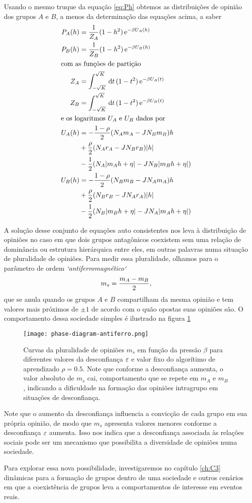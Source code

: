 Usando o mesmo truque da equação \eqref{eq:Ph} obtemos as distribuições de opinião dos grupos $A$ e $B$, a menos da determinação das equações acima, a saber
\begin{align}
  P_A(h) & = {1\over Z_A}(1-h^2)\,\mathrm{e}^{-\beta U_A(h)} \\
  P_B(h) & = {1\over Z_B}(1-h^2)\,\mathrm{e}^{-\beta U_B(h)} \\
\intertext{com as funções de partição}
  Z_A & = \int_{-\sqrt{K}}^{\sqrt{K}}\,\mathrm{d} t\,(1-t^2)\,\mathrm{e}^{-\beta U_A(t)} \\
  Z_B & = \int_{-\sqrt{K}}^{\sqrt{K}}\,\mathrm{d} t\,(1-t^2)\,\mathrm{e}^{-\beta U_B(t)} \\
\intertext{e os logaritmos $U_A$ e $U_B$ dados por}
  U_A(h) & = -{1-\rho\over2}(N_Am_A - JN_Bm_B)h \notag\\
  & + {\rho\over2}(N_Ar_A-JN_Br_B)|h| \notag \\
  & - {1 \over 2}(N_A|m_Ah+\eta|-JN_B|m_Bh+\eta|) \\
  U_B(h) & = -{1-\rho\over2}(N_Bm_B - JN_Am_A)h \notag\\
  & + {\rho\over2}(N_Br_B-JN_Ar_A)|h| \notag \\
  & - {1 \over 2}(N_B|m_Bh+\eta|-JN_A|m_Ah+\eta|)
\end{align}

A solução desse conjunto de equações auto consistentes nos leva à distribuição de opiniões no caso em que dois grupos antagônicos coexistem sem uma relação de dominância ou estrutura hierárquica entre eles, em outras palavras numa situação de pluralidade de opiniões.
Para medir essa pluralidade, olhamos para o parâmetro de ordem \emph{`antiferromagnético`} $$m_s = {m_A - m_B \over 2}\text{,}$$ que se anula quando os grupos $A$ e $B$ compartilham da mesma opinião e tem valores mais próximos de $\pm 1$ de acordo com o quão opostas suas opiniões são.
O comportamento dessa sociedade simples é ilustrado na figura \ref{fig:pd-antiferro}

\begin{figure}[h!]\label{fig:pd-antiferro}
  \centering
  \texttt{[image: phase-diagram-antiferro.png]}
  \caption{Curvas da pluralidade de opiniões $m_s$ em função da pressão $\beta$ para diferentes valores da desconfiança $\varepsilon$ e valor fixo do algorítimo de aprendizado $\rho=0.5$.
Note que conforme a desconfiança aumenta, o valor absoluto de $m_s$ cai, comportamento que se repete em $m_A$ e $m_B$, indicando a dificuldade na formação das opiniões intragrupo em situações de desconfiança.}
\end{figure}

Note que o aumento da desconfiança influencia a convicção de cada grupo em sua própria opinião, de modo que $m_s$ apresenta valores menores conforme a desconfiança $\varepsilon$ aumenta.
Isso nos indica que a desconfiança associada às relações sociais pode ser um mecanismo que possibilita a diversidade de opiniões numa sociedade.

Para explorar essa nova possibilidade, investigaremos no capítulo \ref{ch:C3} dinâmicas para a formação de grupos dentro de uma sociedade e outros cenários em que a coexistência de grupos leva a comportamentos de interesse em eventos reais.
